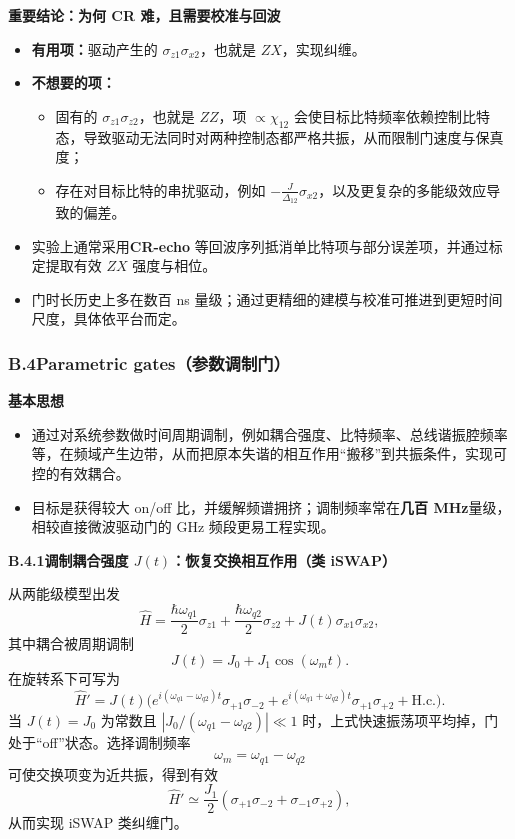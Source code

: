 \documentclass[12pt,a4paper,oneside]{ctexbook}
\begin{document}
\noindent\textbf{重要结论：为何 CR 难，且需要校准与回波}

\begin{itemize}
  \item \textbf{有用项：}驱动产生的 $\sigma_{z1}\sigma_{x2}$，也就是 $ZX$，实现纠缠。
  \item \textbf{不想要的项：}
    \begin{itemize}
      \item 固有的 $\sigma_{z1}\sigma_{z2}$，也就是 $ZZ$，项 $\propto \chi_{12}$ 会使目标比特频率依赖控制比特态，导致驱动无法同时对两种控制态都严格共振，从而限制门速度与保真度；
      \item 存在对目标比特的串扰驱动，例如 $-\frac{J}{\Delta_{12}}\sigma_{x2}$，以及更复杂的多能级效应导致的偏差。
    \end{itemize}
  \item 实验上通常采用\textbf{CR-echo} 等回波序列抵消单比特项与部分误差项，并通过标定提取有效 $ZX$ 强度与相位。
  \item 门时长历史上多在数百 ns 量级；通过更精细的建模与校准可推进到更短时间尺度，具体依平台而定。
\end{itemize}

\subsubsection{B.4\quad Parametric gates（参数调制门）}

\noindent\textbf{基本思想}

\begin{itemize}
  \item 通过对系统参数做时间周期调制，例如耦合强度、比特频率、总线谐振腔频率等，在频域产生边带，从而把原本失谐的相互作用“搬移”到共振条件，实现可控的有效耦合。
  \item 目标是获得较大 on/off 比，并缓解频谱拥挤；调制频率常在\textbf{几百 MHz}量级，相较直接微波驱动门的 GHz 频段更易工程实现。
\end{itemize}

\noindent\textbf{B.4.1\quad 调制耦合强度 $J(t)$：恢复交换相互作用（类 iSWAP）}

从两能级模型出发
\begin{equation}
  \hat H
  =
  \frac{\hbar\omega_{q1}}{2}\sigma_{z1}
  +\frac{\hbar\omega_{q2}}{2}\sigma_{z2}
  +J(t)\sigma_{x1}\sigma_{x2},
  \tag{148}
\end{equation}
其中耦合被周期调制
\[
  J(t)=J_0+J_1\cos(\omega_m t).
\]
在旋转系下可写为
\begin{equation}
  \hat H'
  =J(t)\Big(
    e^{i(\omega_{q1}-\omega_{q2})t}\sigma_{+1}\sigma_{-2}
    +e^{i(\omega_{q1}+\omega_{q2})t}\sigma_{+1}\sigma_{+2}
    +\mathrm{H.c.}
  \Big).
  \tag{149}
\end{equation}
当 $J(t)=J_0$ 为常数且 $|J_0/(\omega_{q1}-\omega_{q2})|\ll 1$ 时，上式快速振荡项平均掉，门处于“off”状态。选择调制频率
\[
  \omega_m=\omega_{q1}-\omega_{q2}
\]
可使交换项变为近共振，得到有效
\begin{equation}
  \hat H' \simeq \frac{J_1}{2}\left(\sigma_{+1}\sigma_{-2}+\sigma_{-1}\sigma_{+2}\right),
  \tag{150}
\end{equation}
从而实现 iSWAP 类纠缠门。
\end{document}
